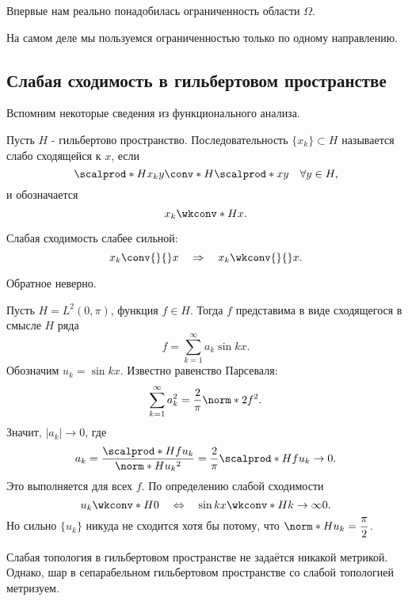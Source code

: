 \begin{note}
Впервые нам реально понадобилась ограниченность области $\Omega$.
\end{note}

\begin{note}
На самом деле мы пользуемся ограниченностью только по одному направлению. 
\end{note}

\subsection{Слабая сходимость в гильбертовом пространстве}
Вспомним некоторые сведения из функционального анализа.
\begin{definition}
Пусть $H$ - гильбертово пространство. Последовательность $\{x_k \} \subset H$ называется слабо сходящейся к $x$, если
$$\scalprod*{H}{x_k}{y} \conv*{H}{} \scalprod*{}{x}{y} \quad \forall y \in H,$$
и обозначается
$$ x_k \wkconv*{H}{} x.$$
\end{definition}

\begin{note}
Слабая сходимость слабее сильной:
$$ x_k \conv{}{} x \quad \Rightarrow \quad x_k \wkconv{}{} x.$$
\end{note}

\begin{note}
Обратное неверно.
\end{note}

\begin{example} Пусть $H = L^2(0, \pi)$, функция $f \in H$. Тогда $f$ представима в виде сходящегося в смысле $H$ ряда
$$ f = \sum_{k=1}^\infty a_k \sin kx.$$
Обозначим $u_k = \sin kx$. Известно равенство Парсеваля:
$$ \sum_{k=1}^\infty a_k^2 = \frac {2} {\pi} \norm*{2}{f}^2.$$
Значит, $|a_k| \to 0$, где
$$ a_k = \frac {\scalprod*{H}{f}{u_k}} {\norm*{H}{u_k}^2} = \frac {2} {\pi} \scalprod*{H}{f}{u_k} \to 0.$$
Это выполняется для всех $f$. По определению слабой сходимости
$$ u_k \wkconv*{H}{} 0 \quad \Leftrightarrow \quad \sin kx \wkconv*{H}{k \to \infty} 0.$$
Но сильно $\{ u_k \}$ никуда не сходится хотя бы потому, что $\displaystyle \norm*{H}{u_k} = \frac {\pi} {2}$.
\end{example}

\begin{note}
Слабая топология в гильбертовом пространстве не задаётся никакой метрикой. Однако, шар в сепарабельном гильбертовом пространстве со слабой топологией метризуем.
\end{note}

